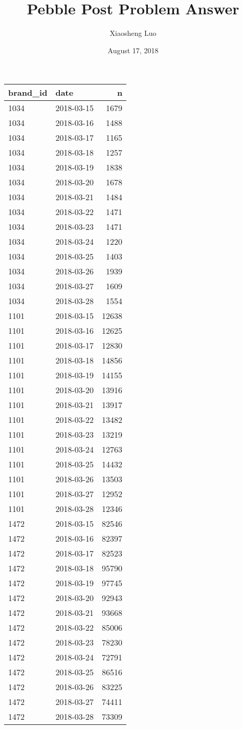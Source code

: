 \documentclass[]{article}
\title{Pebble Post Problem Answer}
\author{Xiaosheng Luo}
\date{August 17, 2018}
\newenvironment{Shaded}{\begin{snugshade}}{\end{snugshade}}
\newcommand{\KeywordTok}[1]{\textcolor[rgb]{0.13,0.29,0.53}{\textbf{#1}}}
\newcommand{\StringTok}[1]{\textcolor[rgb]{0.31,0.60,0.02}{#1}}
\newcommand{\CommentTok}[1]{\textcolor[rgb]{0.56,0.35,0.01}{\textit{#1}}}
\newcommand{\OperatorTok}[1]{\textcolor[rgb]{0.81,0.36,0.00}{\textbf{#1}}}
\newcommand{\NormalTok}[1]{#1}
\begin{document}
\maketitle

\begin{Shaded}
\end{Shaded}

\begin{longtable}[]{@{}llr@{}}
\toprule
brand\_id & date & n\tabularnewline
\midrule
\endhead
1034 & 2018-03-15 & 1679\tabularnewline
1034 & 2018-03-16 & 1488\tabularnewline
1034 & 2018-03-17 & 1165\tabularnewline
1034 & 2018-03-18 & 1257\tabularnewline
1034 & 2018-03-19 & 1838\tabularnewline
1034 & 2018-03-20 & 1678\tabularnewline
1034 & 2018-03-21 & 1484\tabularnewline
1034 & 2018-03-22 & 1471\tabularnewline
1034 & 2018-03-23 & 1471\tabularnewline
1034 & 2018-03-24 & 1220\tabularnewline
1034 & 2018-03-25 & 1403\tabularnewline
1034 & 2018-03-26 & 1939\tabularnewline
1034 & 2018-03-27 & 1609\tabularnewline
1034 & 2018-03-28 & 1554\tabularnewline
1101 & 2018-03-15 & 12638\tabularnewline
1101 & 2018-03-16 & 12625\tabularnewline
1101 & 2018-03-17 & 12830\tabularnewline
1101 & 2018-03-18 & 14856\tabularnewline
1101 & 2018-03-19 & 14155\tabularnewline
1101 & 2018-03-20 & 13916\tabularnewline
1101 & 2018-03-21 & 13917\tabularnewline
1101 & 2018-03-22 & 13482\tabularnewline
1101 & 2018-03-23 & 13219\tabularnewline
1101 & 2018-03-24 & 12763\tabularnewline
1101 & 2018-03-25 & 14432\tabularnewline
1101 & 2018-03-26 & 13503\tabularnewline
1101 & 2018-03-27 & 12952\tabularnewline
1101 & 2018-03-28 & 12346\tabularnewline
1472 & 2018-03-15 & 82546\tabularnewline
1472 & 2018-03-16 & 82397\tabularnewline
1472 & 2018-03-17 & 82523\tabularnewline
1472 & 2018-03-18 & 95790\tabularnewline
1472 & 2018-03-19 & 97745\tabularnewline
1472 & 2018-03-20 & 92943\tabularnewline
1472 & 2018-03-21 & 93668\tabularnewline
1472 & 2018-03-22 & 85006\tabularnewline
1472 & 2018-03-23 & 78230\tabularnewline
1472 & 2018-03-24 & 72791\tabularnewline
1472 & 2018-03-25 & 86516\tabularnewline
1472 & 2018-03-26 & 83225\tabularnewline
1472 & 2018-03-27 & 74411\tabularnewline
1472 & 2018-03-28 & 73309\tabularnewline
\bottomrule
\end{longtable}
\end{document}
